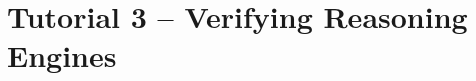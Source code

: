 \section{Tutorial 3 -- Verifying Reasoning Engines}

{
  \let\section\subsection
  \let\subsection\subsubsection
  \let\subsubsection\paragraph
  
  
  }
